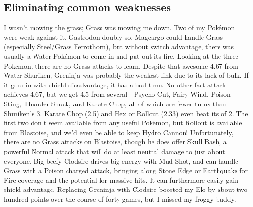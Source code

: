 \subsection{Eliminating common weaknesses\label{subsec:eliminatingweak}}
I wasn't mowing the grass; Grass was mowing me down.
Two of my Pokémon were weak against it, Gastrodon doubly so.
Magcargo could handle Grass (especially Steel/Grass Ferrothorn), but
 without switch advantage, there was usually a Water Pokémon to come
 in and put out its fire.
Looking at the three Pokémon, there are no Grass attacks to learn.
Despite that awesome 4.67 \EPT{} from Water Shuriken, Greninja was probably
  the weakest link due to its lack of bulk.
If it goes in with shield disadvantage, it has a bad time.
No other fast attack achieves 4.67, but we get 4.5 from several---Psycho
  Cut, Fairy Wind, Poison Sting, Thunder Shock, and Karate Chop,
  all of which are fewer turns than Shuriken's 3.
Karate Chop (2.5) and Hex or Rollout (2.33) even beat its \PPT{} of 2.
The first two don't seem available from any useful Pokémon, but
  Rollout is available from Blastoise, and we'd even be able to
  keep Hydro Cannon!
Unfortunately, there are no Grass attacks on Blastoise, though
  he does offer Skull Bash, a powerful Normal attack that
  will do at least neutral damage to just about everyone.
Big beefy Clodsire drives big energy with Mud Shot, and can handle
  Grass with a Poison charged attack, bringing along Stone Edge
  or Earthquake for Fire coverage and the potential for massive hits.
It can furthermore easily gain shield advantage.
Replacing Greninja with Clodsire boosted my Elo by about two hundred points
 over the course of forty games, but I missed my froggy buddy.
